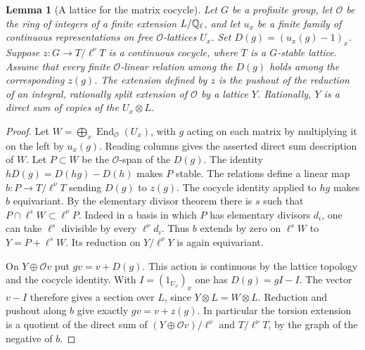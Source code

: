 \documentclass[a4paper,11pt]{article}
\newtheorem{lemma}[proposition]{Lemma}
\theoremstyle{definition}
\theoremstyle{remark}
\numberwithin{equation}{section}
\begin{document}
\begin{lemma}[A lattice for the matrix cocycle]\leavevmode
\label{lem:graphrealization724}
Let \(G\) be a profinite group, let \(\mathcal O\) be the ring of integers
of a finite extension \(L/\mathbb Q_\ell\), and let \(u_x\) be a finite family
of continuous representations on free \(\mathcal O\)-lattices \(U_x\).
Set \(D(g)=(u_x(g)-1)_x\). Suppose \(z:G\to T/\ell^\nu T\) is
a continuous cocycle, where \(T\) is a \(G\)-stable lattice. Assume that
every finite \(\mathcal O\)-linear relation among the \(D(g)\) holds among
the corresponding \(z(g)\). The extension defined by \(z\) is the
pushout of the reduction of an integral, rationally split extension
of \(\mathcal O\) by a lattice \(Y\). Rationally, \(Y\) is a direct sum
of copies of the \(U_x\otimes L\).
\end{lemma}
\begin{proof}
Let \(W=\bigoplus_x\operatorname{End}_{\mathcal O}(U_x)\), with \(g\)
acting on each matrix by multiplying it on the left by \(u_x(g)\).
Reading columns gives the asserted direct sum description of \(W\).
Let \(P\subset W\) be the \(\mathcal O\)-span of the \(D(g)\). The identity
\(hD(g)=D(hg)-D(h)\) makes \(P\) stable. The relations define a linear
map \(b:P\to T/\ell^\nu T\) sending \(D(g)\) to \(z(g)\). The cocycle
identity applied to \(hg\) makes \(b\) equivariant. By the elementary
divisor theorem there is \(s\) such that \(P\cap\ell^sW\subset\ell^\nu P\).
Indeed in a basis in which \(P\) has elementary divisors \(d_i\), one
can take \(\ell^s\) divisible by every \(\ell^\nu d_i\). Thus \(b\)
extends by zero on \(\ell^sW\) to \(Y=P+\ell^sW\). Its reduction on
\(Y/\ell^\nu Y\) is again equivariant.

On \(Y\oplus\mathcal O v\) put \(g v=v+D(g)\). This action is continuous
by the lattice topology and the cocycle identity. With \(I=(1_{U_x})_x\)
one has \(D(g)=gI-I\). The vector \(v-I\) therefore gives a section
over \(L\), since \(Y\otimes L=W\otimes L\). Reduction and pushout along
\(b\) give exactly \(g v=v+z(g)\). In particular the torsion extension
is a quotient of the direct sum of \((Y\oplus\mathcal O v)/\ell^\nu\)
and \(T/\ell^\nu T\), by the graph of the negative of \(b\).
\end{proof}
\end{document}
